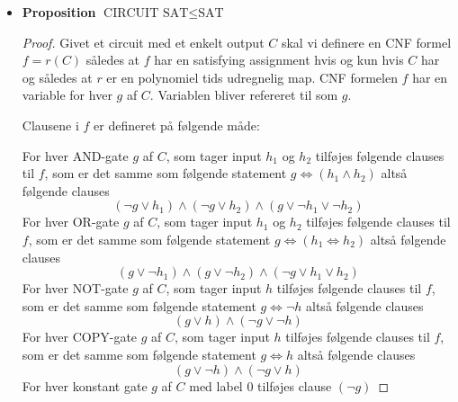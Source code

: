 \begin{itemize}
\begin{proof}
  Lad subcircuit $D_i$ være defineret på følgende. Lad $M$ være en Turing maskine der afgøre $L'$ i polynomiel tid. Fra en tideligere lemma ved vi at givet en input længde $n$ outputter den et circuit $C_n$ der er satisfiable hvis og kun hvis Turing maskinen acceptere. Vi sætter alle inputs for $x$ til en den $x$ der er givet og erstatter alle de krævede med constant gates i.e. således at kun $y$ er variable. Dermed har vi et korrekt circuit $D_i$. Det følger af Polynomial Church-Turing thesis, at dette er korrekt.

  \end{proof}
  \item \textbf{Proposition} $\text{CIRCUIT SAT} \leq \text{SAT}$
  \begin{proof} 
    Givet et circuit med et enkelt output $C$ skal vi definere en CNF formel $f=r(C)$ således at $f$ har en satisfying assignment hvis og kun hvis $C$ har og således at $r$ er en polynomiel tids udregnelig map. CNF formelen $f$ har en variable for hver $g$ af $C$. Variablen bliver refereret til som $g$. 
    \smallskip

    Clausene i $f$ er defineret på følgende måde: 
    \smallskip

    For hver AND-gate $g$ af $C$, som tager input $h_1$ og $h_2$ tilføjes følgende clauses til $f$, som er det samme som følgende statement $g \Leftrightarrow (h_1 \land h_2)$ altså følgende clauses 
    \begin{equation*}
      (\neg g \lor h_1) \land (\neg g \lor h_2) \land (g \lor \neg h_1 \lor \neg h_2)
    \end{equation*}
    For hver OR-gate $g$ af $C$, som tager input $h_1$ og $h_2$ tilføjes følgende clauses til $f$, som er det samme som følgende statement $g \Leftrightarrow (h_1 \Leftrightarrow h_2)$ altså følgende clauses 
    \begin{equation*}
      (g \lor \neg h_1) \land (g \lor \neg h_2) \land (\neg g \lor h_1 \lor h_2)
    \end{equation*}
    For hver NOT-gate $g$ af $C$, som tager input $h$ tilføjes følgende clauses til $f$, som er det samme som følgende statement $g \Leftrightarrow \neg h$ altså følgende clauses 
    \begin{equation*}
      (g \lor h) \land (\neg g \lor \neg h)
    \end{equation*}
    For hver COPY-gate $g$ af $C$, som tager input $h$ tilføjes følgende clauses til $f$, som er det samme som følgende statement $g \Leftrightarrow h$ altså følgende clauses 
    \begin{equation*}
      (g \lor \neg h) \land (\neg g \lor h)
    \end{equation*}
    For hver konstant gate $g$ af $C$ med label $0$ tilføjes clause $(\neg g)$  
    \smallskip


\end{proof}
\end{itemize}
